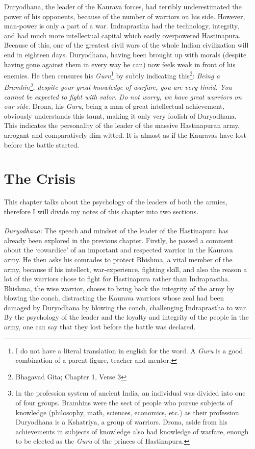 \documentclass{article}
\newcommand{\tit}[1]{\textit{#1}}
\newcommand{\guru}{\tit{Guru}}
\begin{document}
Duryodhana, the leader of the Kaurava forces, had terribly underestimated the power of his opponents, because of the number of warriors on his side. However, man-power is only a part of a war. Indraprastha had the technology, integrity, and had much more intellectual capital which easily overpowered Hastinapura. Because of this, one of the greatest civil wars of the whole Indian civilization will end in eighteen days. Duryodhana, having been brought up with morals (despite having gone against them in every way he can) now feels weak in front of his enemies. He then censures his \guru \footnote[1]{I do not have a literal translation in english for the word. A \tit{Guru} is a good combination of a parent-figure, teacher and mentor.} by subtly indicating this\footnote[2]{Bhagavad Gita; Chapter 1, Verse 3}: \tit{Being a Bramhin\footnote[3]{In the profession system of ancient India, an individual was divided into one of four groups. Bramhins were the sect of people who pursue subjects of knowledge (philosophy, math, sciences, economics, etc.) as their profession. Duryodhana is a Kshatriya, a group of warriors. Drona, aside from his achievements in subjects of knowledge also had knowledge of warfare, enough to be elected as the \tit{Guru} of the princes of Hastinapura.}, despite your great knowledge of warfare, you are very timid. You cannot be expected to fight with valor. Do not worry, we have great warriors on our side.} Drona, his \tit{Guru}, being a man of great intellectual achievement, obviously understands this taunt, making it only very foolish of Duryodhana. This indicates the personality of the leader of the massive Hastinapuran army, arrogant and comparatively dim-witted. It is almost as if the Kauravas have lost before the battle started.
\newpage \section{The Crisis}
This chapter talks about the psychology of the leaders of both the armies, therefore I will divide my notes of this chapter into two sections.
\\\\\tit{Duryodhana: } The speech and mindset of the leader of the Hastinapura has already been explored in the previous chapter. Firstly, he passed a comment about the `cowardice’ of an important and respected warrior in the Kaurava army. He then asks his comrades to protect Bhishma, a vital member of the army, because if his intellect, war-experience, fighting skill, and also the reason a lot of the warriors chose to fight for Hastinapura rather than Indraprastha. Bhishma, the wise warrior, choses to bring back the integrity of the army by blowing the conch, distracting the Kaurava warriors whose zeal had been damaged by Duryodhana by blowing the conch, challenging Indraprastha to war. By the psychology of the leader and the loyalty and integrity of the people in the army, one can say that they lost before the battle was declared.
\end{document}
